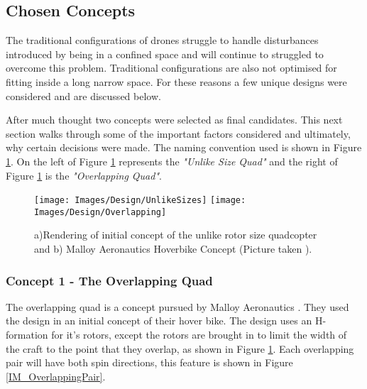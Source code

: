 		\subsection{Chosen Concepts}
		The traditional configurations of drones struggle to handle disturbances introduced by being in a confined space and will continue to struggled to overcome this problem. Traditional configurations are also not optimised for fitting inside a long narrow space. For these reasons a few unique designs were considered and are discussed below.
		
		After much thought two concepts were selected as final candidates. This next section walks through some of the important factors considered and ultimately, why certain decisions were made. The naming convention used is shown in Figure \ref{IM_UnlikeSizes}.
		On the left of Figure \ref{IM_UnlikeSizes} represents the \textit{"Unlike Size Quad"} and the right of Figure \ref{IM_UnlikeSizes} is the \textit{"Overlapping Quad"}. 
		\begin{figure}[H]
		\centering
		\texttt{[image: Images/Design/UnlikeSizes]}
		\texttt{[image: Images/Design/Overlapping]}
		\caption{a)Rendering of initial concept of the unlike rotor size quadcopter and b) Malloy Aeronautics Hoverbike Concept (Picture taken \cite{MAHover}).}
		\label{IM_UnlikeSizes}
		\end{figure}
			\subsubsection{Concept 1 - The Overlapping Quad}
			The overlapping quad is a concept pursued by Malloy Aeronautics \cite{MAHover}. They used the design in an initial concept of their hover bike. The design uses an H-formation for it's rotors, except the rotors are brought in to limit the width of the craft to the point that they overlap, as shown in Figure \ref{IM_UnlikeSizes}. Each overlapping pair will have both spin directions, this feature is shown in Figure \ref{IM_OverlappingPair}.
		
